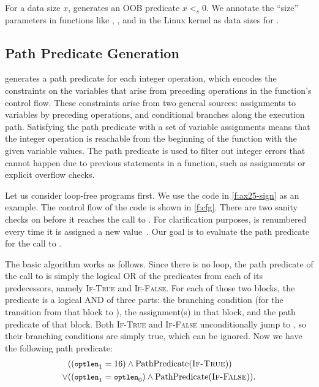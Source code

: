 For a data size $x$, \sys generates an OOB predicate $x <_s 0$.
We annotate the ``size'' parameters in functions 
like , , and  in
the Linux kernel as data sizes for \sys.

\subsection{Path Predicate Generation}
\label{s:gen:path}

\sys generates a path predicate for each integer operation, which encodes
the constraints on the variables that arise from preceding operations
in the function's control flow.  These constraints arise from two general
sources: assignments to variables by preceding operations, and conditional
branches along the execution path.  Satisfying the path predicate with
a set of variable assignments means that the integer operation is
reachable from the beginning of the function with the given variable values.
The path predicate is used to filter out integer errors that cannot
happen due to previous statements in a function, such as assignments or
explicit overflow checks.

Let us consider loop-free programs first.
%
We use the code in \autoref{f:ax25-sign} as an example.  The control flow of
the code is shown in \autoref{f:cfg}.  There are two sanity checks
on  before it reaches the call to .
For clarification purposes,  is renumbered every time it is
assigned a new value~\cite[\subsectionautorefname~8.11]{whale}.  Our
goal is to evaluate the path predicate for the call to .

The basic algorithm works as follows.  Since there is no loop, the
path predicate of the call to  is simply the
logical OR of the predicates from each of its predecessors, namely
\textsc{If-True} and \textsc{If-False}.  For each of those two blocks,
the predicate is a logical AND of three parts: the branching condition
(for the transition from that block to ), the
assignment(s) in that block, and the path predicate
of that block.  Both \textsc{If-True} and \textsc{If-False}
unconditionally jump to , so their branching
conditions are simply true, which can be ignored.  Now we have the
following path predicate:
\newcommand{\optlen}{{\small \texttt{optlen}}}
\newcommand{\pc}{\textrm{PathPredicate}}
%
\begin{align*}
& ((\optlen_1 = 16) \land \pc(\textsc{If-True})) \\
\lor & ((\optlen_1 = \optlen_0) \land \pc(\textsc{If-False})).
\end{align*}

